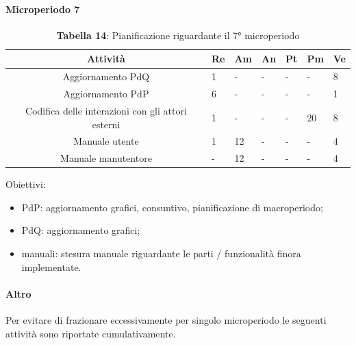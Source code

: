\paragraph{Microperiodo 7}
\begin{table}[H]
	\centering
	\renewcommand{\arraystretch}{1.5}
	\begin{tabular}{|c|p{10mm}|p{10mm}|p{10mm}|p{10mm}|p{10mm}|p{10mm}|}
		\hline
		\rowcolor{lighter-grayer}
		\textbf{Attività}                         & \textbf{Re} & \textbf{Am} & \textbf{An} & \textbf{Pt} & \textbf{Pm} & \textbf{Ve} \\ \hline
		
		Aggiornamento PdQ                                                                                & 1           &      -       &    -         &       -      &     -        & 8           \\ \hline
		Aggiornamento PdP                                                                                & 6           &     -        &      -       &     -        &     -        & 1           \\ \hline
		Codifica delle interazioni con gli attori esterni                                                & 1           &     -        &    -        &     -        & 20          & 8           \\ \hline
		Manuale utente      & 1           & 12          &     -        &       -      &        -     & 4           \\ \hline
		Manuale manutentore &     -        & 12          &    -         &     -        &      -       & 4           \\ \hline

		
	\end{tabular}
	\caption*{\textbf{Tabella 14}: Pianificazione riguardante il 7° microperiodo\\}
\end{table}

Obiettivi:
\begin{itemize}
	\item PdP: aggiornamento grafici, consuntivo, pianificazione di macroperiodo;
	\item PdQ: aggiornamento grafici;
	\item manuali: stesura manuale riguardante le parti / funzionalità finora implementate.
\end{itemize}

\paragraph{Altro}
Per evitare di frazionare eccessivamente per singolo microperiodo le seguenti attività sono riportate cumulativamente.

